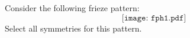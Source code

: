 \documentclass{ximera}
\author{Bart Snapp}
\begin{document}
\begin{exercise}
  Consider the following frieze pattern:
  \[
  \texttt{[image: fph1.pdf]}
  \]
  Select all symmetries for this pattern.
  \begin{selectAll}
  \end{selectAll}
\end{exercise}
\end{document}
